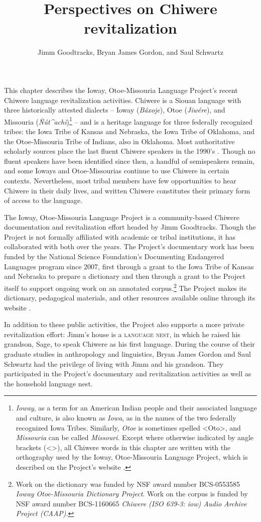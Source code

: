 \documentclass[output=paper]{LSP/langsci}
\author{Jimm Goodtracks, Bryan James Gordon, and Saul Schwartz}
\title{Perspectives on Chiwere revitalization}
\begin{document}
This chapter describes the Ioway, Otoe-Missouria Language Project's recent Chiwere language revitalization activities. Chiwere is a Siouan language with three historically attested dialects -- Ioway (\emph{Báxoje}), Otoe (\emph{Jiwére}), and Missouria (\emph{\~Nút\^{ }achi})\footnote{\emph{Ioway}, as a term for an American Indian people and their associated language and culture, is also known as \emph{Iowa}, as in the names of the two federally recognized Iowa Tribes. Similarly, \emph{Otoe} is sometimes spelled <Oto>, and \emph{Missouria} can be called \emph{Missouri}. Except where otherwise indicated by angle brackets (<>), all Chiwere words in this chapter are written with the orthography used by the Ioway, Otoe-Missouria Language Project, which is described on the Project's website \citep{GoodtracksND}.} -- and is a heritage language for three federally recognized tribes: the Iowa Tribe of Kansas and Nebraska, the Iowa Tribe of Oklahoma, and the Otoe-Missouria Tribe of Indians, also in Oklahoma. Most authoritative scholarly sources place the last fluent Chiwere speakers in the 1990's \citep{Lewisetal2013, ParksRankin2001}. Though no fluent speakers have been identified since then, a handful of semispeakers remain, and some Ioways and Otoe-Missourias continue to use Chiwere in certain contexts. Nevertheless, most tribal members have few opportunities to hear Chiwere in their daily lives, and written Chiwere constitutes their primary form of access to the language.

The Ioway, Otoe-Missouria Language Project is a community-based Chiwere documentation and revitalization effort headed by Jimm Goodtracks. Though the Project is not formally affiliated with academic or tribal institutions, it has collaborated with both over the years. The Project's documentary work has been funded by the National Science Foundation's Documenting Endangered Languages program since 2007, first through a grant to the Iowa Tribe of Kansas and Nebraska to prepare a dictionary and then through a grant to the Project itself to support ongoing work on an annotated corpus.\footnote{Work on the dictionary was funded by NSF award number BCS-0553585 \emph{Ioway Otoe-Missouria Dictionary Project}. Work on the corpus is funded by NSF award number BCS-1160665 \emph{Chiwere (ISO 639-3: iow) Audio Archive Project (CAAP)}.}  The Project makes its dictionary, pedagogical materials, and other resources available online through its website \citep{GoodtracksND}.

In addition to these public activities, the Project also supports a more private revitalization effort: Jimm's house is a \textsc{language nest}, in which he raised his grandson, Sage, to speak Chiwere as his first language. During the course of their graduate studies in anthropology and linguistics, Bryan James Gordon and Saul Schwartz had the privilege of living with Jimm and his grandson. They participated in the Project's documentary and revitalization activities as well as the household language nest.
\end{document}
